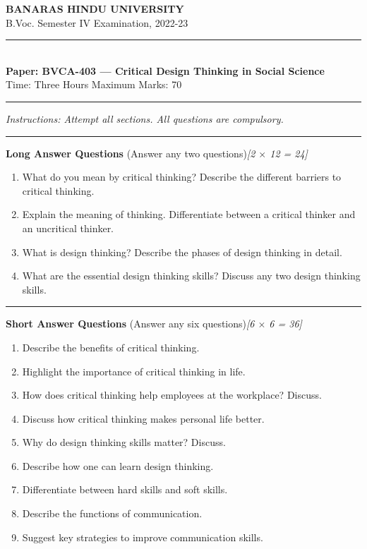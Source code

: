 \documentclass[11pt,a4paper]{article}
\newcommand{\pts}[1]{\hfill\textit{[#1]}}
\begin{document}
\begin{center}
  {\large\bfseries BANARAS HINDU UNIVERSITY}\\[2pt]
  {\normalsize B.Voc. Semester IV Examination, 2022-23}\\[6pt]
  \rule{0.8\linewidth}{0.5pt}\\[6pt]
  {\large\bfseries Paper: BVCA-403 --- Critical Design Thinking in Social Science}\\[4pt]
  {\normalsize Time: Three Hours \hfill Maximum Marks: 70}
\end{center}

\rule{\linewidth}{0.4pt}

\smallskip
\noindent\textit{Instructions: Attempt all sections. All questions are compulsory.}

\bigskip

\bigskip{}

\rule{\linewidth}{0.4pt}\smallskip

\noindent\textbf{Long Answer Questions} (Answer any two questions)\pts{2 $\times$ 12 = 24}
\begin{enumerate}[label=\arabic*.,leftmargin=*,itemsep=8pt]
  \item What do you mean by critical thinking? Describe the different barriers to critical thinking.
  \item Explain the meaning of thinking. Differentiate between a critical thinker and an uncritical thinker.
  \item What is design thinking? Describe the phases of design thinking in detail.
  \item What are the essential design thinking skills? Discuss any two design thinking skills.
\end{enumerate}

\bigskip{}

\rule{\linewidth}{0.4pt}\smallskip

\noindent\textbf{Short Answer Questions} (Answer any six questions)\pts{6 $\times$ 6 = 36}
\begin{enumerate}[label=\alph*.,leftmargin=*,itemsep=8pt]
  \item Describe the benefits of critical thinking.
  \item Highlight the importance of critical thinking in life.
  \item How does critical thinking help employees at the workplace? Discuss.
  \item Discuss how critical thinking makes personal life better.
  \item Why do design thinking skills matter? Discuss.
  \item Describe how one can learn design thinking.
  \item Differentiate between hard skills and soft skills.
  \item Describe the functions of communication.
  \item Suggest key strategies to improve communication skills.
\end{enumerate}
\end{document}
